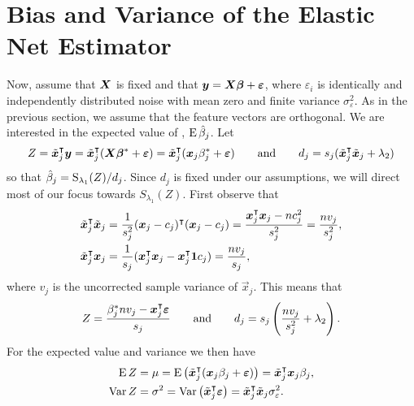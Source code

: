 \section{Bias and Variance of the Elastic Net Estimator}\label{sec:theory}


Now, assume that \(\boldsymbol{X}\) is fixed and that \(\boldsymbol{y} = \boldsymbol{X}\boldsymbol{\beta} + \boldsymbol{\varepsilon}\), where \(\varepsilon_i\) is identically and independently distributed noise with mean zero and finite variance \(\sigma_\varepsilon^2\). As in the previous section, we assume that the feature vectors are orthogonal. We are interested in the expected value of , \(\operatorname{E} \hat{\beta}_j\). Let
\[
  Z = \tilde{\boldsymbol{x}}_j^\intercal \boldsymbol{y} = \tilde{\boldsymbol{x}}_j^\intercal(\boldsymbol{X}\boldsymbol{\beta}^* + \boldsymbol{\varepsilon}) = \tilde{\boldsymbol{x}}_j^\intercal (\boldsymbol{x}_j\beta_j^* + \boldsymbol{\varepsilon})
  \qquad
  \text{and}
  \qquad
  d_j = s_j(\tilde{\boldsymbol{x}}_j^\intercal \tilde{\boldsymbol{x}}_j + \lambda_2)
\]
so that \(\hat{\beta}_j = \operatorname{S}_{\lambda_1}(Z)/d_j\). Since \(d_j\) is fixed under our assumptions, we will direct most of our focus towards \(S_{\lambda_1}(Z)\). First observe that
\[
  \begin{aligned}
    \tilde{\boldsymbol{x}}_j^\intercal \tilde{\boldsymbol{x}}_j & = \frac{1}{s_j^2}(\boldsymbol{x}_j - c_j)^\intercal (\boldsymbol{x}_j - c_j) = \frac{\boldsymbol{x}_j^\intercal\boldsymbol{x}_j - nc_j^2}{s^2_j} = \frac{n v_j}{s_j^2}, \\
    \tilde{\boldsymbol{x}}_j^\intercal \boldsymbol{x}_j         & = \frac{1}{s_j}(\boldsymbol{x}_j^\intercal \boldsymbol{x}_j - \boldsymbol{x}_j^\intercal \boldsymbol{1} c_j) = \frac{n v_j}{s_j},
  \end{aligned}
\]
where \(v_j\) is the uncorrected sample variance of \(\vec{x}_j\). This means that
\begin{equation}
  \label{eq:z-d}
  Z = \frac{\beta_j^* n v_j- \boldsymbol{x}_j^\intercal \boldsymbol{\varepsilon}}{s_j}
  \qquad\text{and}\qquad
  d_j = s_j\left(\frac{n v_j}{s_j^2} + \lambda_2\right).
\end{equation}
For the expected value and variance we then have
\begin{align*}
  \operatorname{E} Z   & = \mu = \operatorname{E} \left( \tilde{\boldsymbol{x}}_j^\intercal (\boldsymbol{x}_j\beta_j + \boldsymbol{\varepsilon}) \right)  = \tilde{\boldsymbol{x}}_j^\intercal\boldsymbol{x}_j \beta_j,      \\
  \operatorname{Var} Z & = \sigma^2 = \operatorname{Var}\left(\tilde{\boldsymbol{x}}_j ^\intercal \boldsymbol{\varepsilon}\right) = \tilde{\boldsymbol{x}}_j^\intercal \tilde{\boldsymbol{x}}_j\sigma_\varepsilon^2 .
\end{align*}

